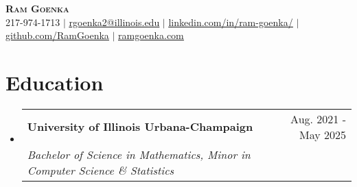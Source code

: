 \documentclass[letterpaper,11pt]{article}
\makeatletter
\newcommand{\resumeEduchead}[4]{
  \vspace{-2pt}\item
    \begin{tabular*}{0.97\textwidth}[t]{l@{\extracolsep{\fill}}r}
      \textbf{#1} & #2 \\
      \textit{\small#3} & \textit{\small #4} \\
    \end{tabular*}\vspace{-7pt}}
\newcommand{\resumeSubHeadingListStart}{\begin{itemize}[leftmargin=0.15in, label={}]}
\newcommand{\resumeSubHeadingListEnd}{\end{itemize}}
\makeatother
\begin{document}
\begin{center}
    \textbf{\Huge \scshape Ram Goenka} \\ \vspace{1pt}
    \small 217-974-1713 $|$ \href{mailto:rgoenka2@illinois.edu}{\underline{rgoenka2@illinois.edu}} $|$ 
    \href{https://www.linkedin.com/in/ram-goenka/}{\underline{linkedin.com/in/ram-goenka/}} $|$
    \href{https://github.com/RamGoenka}{\underline{github.com/RamGoenka}} $|$
    \href{http://ramgoenka.com/}{\underline{ramgoenka.com}}
\end{center}
\section{Education}
  \resumeSubHeadingListStart
    \resumeEduchead
      {University of Illinois Urbana-Champaign}{Aug. 2021 - May 2025}
      {Bachelor of Science in Mathematics, Minor in Computer Science \& Statistics}{~~}
  \resumeSubHeadingListEnd
\end{document}
